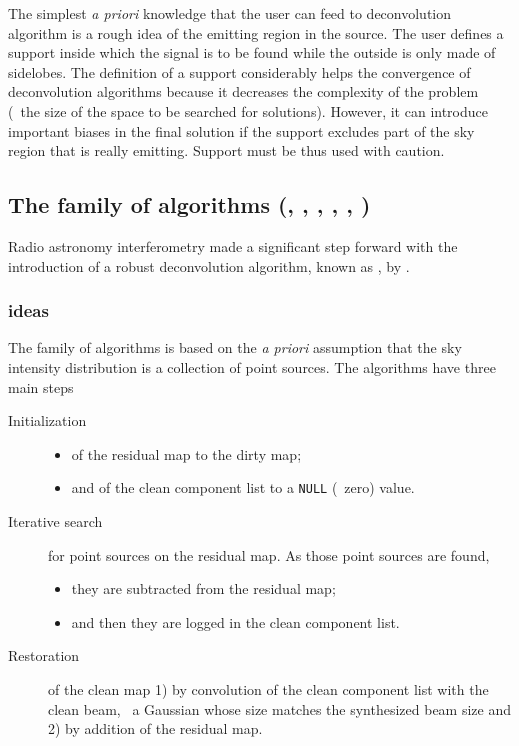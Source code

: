 The simplest \emph{a priori} knowledge that the user can feed to
deconvolution algorithm is a rough idea of the emitting region in the
source.  The user defines a support inside which the signal is to be found
while the outside is only made of sidelobes. The definition of a support
considerably helps the convergence of deconvolution algorithms because it
decreases the complexity of the problem (\ie\ the size of the space to be
searched for solutions). However, it can introduce important biases in the
final solution if the support excludes part of the sky region that is really
emitting. Support must be thus used with caution.

\subsection{The family of \clean{} algorithms (, ,
  , , , )}
\label{sub:single:clean}

Radio astronomy interferometry made a significant step forward with the
introduction of a robust deconvolution algorithm, known as \clean{}, by
\cite{hogbom74}.

\subsubsection{\clean{} ideas}

The family of \clean{} algorithms is based on the \emph{a priori}
assumption that the sky intensity distribution is a collection of point
sources. The algorithms have three main steps
\begin{description}
\item[Initialization] \mbox{}
  \begin{itemize}
  \item of the residual map to the dirty map;
  \item and of the clean component list to a \texttt{NULL} (\ie\ zero)
    value.
  \end{itemize}
\item[Iterative search] for point sources on the residual map. As those
  point sources are found,
  \begin{itemize}
  \item they are subtracted from the residual map;
  \item and then they are logged in the clean component list.
  \end{itemize}
\item[Restoration] of the clean map 1) by convolution of the clean
  component list with the clean beam, \ie\ a Gaussian whose size matches
  the synthesized beam size and 2) by addition of the residual map.
\end{description}

